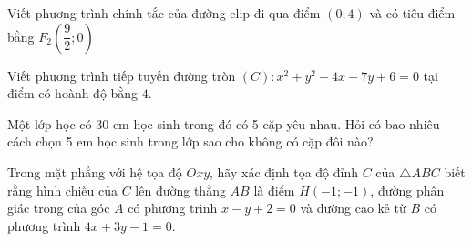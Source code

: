 \begin{ex}
Viết phương trình chính tắc của đường elip đi qua điểm $(0;4)$ và có tiêu điểm bằng $F_2(\dfrac92;0)$
\end{ex}
\begin{ex}
Viết phương trình tiếp tuyến đường tròn $(C)\colon x^2+y^2-4x-7y+6=0$ tại điểm có hoành độ bằng $4$.
\end{ex}
\begin{ex}
Một lớp học có 30 em học sinh trong đó có 5 cặp yêu nhau. Hỏi có bao nhiêu cách chọn 5 em học sinh trong lớp sao cho không có cặp đôi nào?
\end{ex}
\begin{ex}
Trong mặt phẳng với hệ tọa độ $Oxy$, hãy xác định tọa độ đỉnh $C$ của $\triangle ABC$ biết rằng hình chiếu của $C$ lên đường thẳng $AB$ là điểm $H(-1;-1)$, đường phân giác trong của góc $A$ có phương trình $x-y+2=0$ và đường cao kẻ từ $B$ có phương trình $4x+3y-1=0$.
\end{ex}



